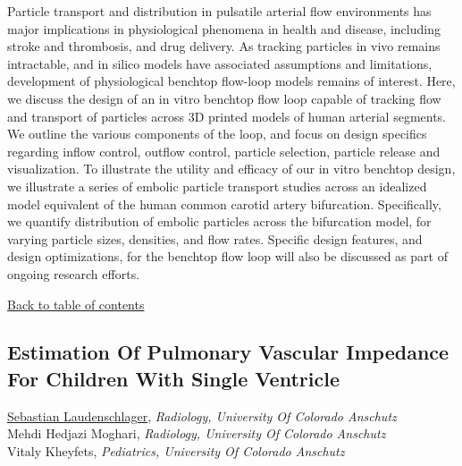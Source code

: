 \noindent Particle transport and distribution in pulsatile arterial flow environments has major implications in physiological phenomena in health and disease, including stroke and thrombosis, and drug delivery. As tracking particles in vivo remains intractable, and in silico models have associated assumptions and limitations, development of physiological benchtop flow-loop models remains of interest. Here, we discuss the design of an in vitro benchtop flow loop capable of tracking flow and transport of particles across 3D printed models of human arterial segments. We outline the various components of the loop, and focus on design specifics regarding inflow control, outflow control, particle selection, particle release and visualization. To illustrate the utility and efficacy of our in vitro benchtop design, we illustrate a series of embolic particle transport studies across an idealized model equivalent of the human common carotid artery bifurcation. Specifically, we quantify distribution of embolic particles across the bifurcation model, for varying particle sizes, densities, and flow rates. Specific design features, and design optimizations, for the benchtop flow loop will also be discussed as part of ongoing research efforts.   \\ 
\begin{flushright}\vspace{-0.2 in}\hyperlink{toc}{Back to table of contents}\end{flushright}\vspace{-0.2 in}
\hypertarget{SebastianLaudenschlager}{\subsection*{\color{CUGOLD} Estimation Of Pulmonary Vascular Impedance For Children With Single Ventricle}} \vsp 
\underline{Sebastian Laudenschlager}, \textit{Radiology, University Of Colorado Anschutz}\\ 
{Mehdi Hedjazi Moghari}, \textit{Radiology, University Of Colorado Anschutz}\\ 
{Vitaly Kheyfets}, \textit{Pediatrics, University Of Colorado Anschutz}\\ 
\vspace{-0.1 in} \\ 
